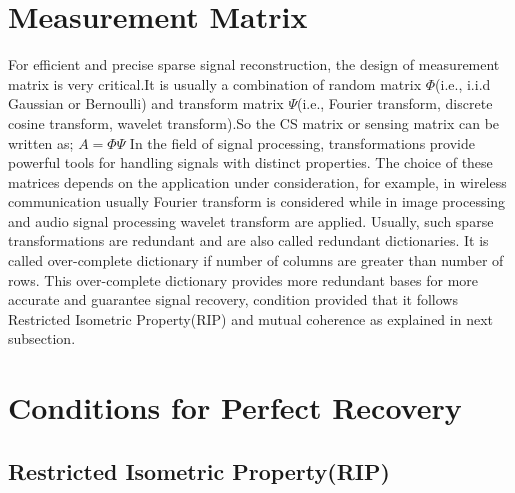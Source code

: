 


\section{Measurement Matrix}
For efficient and precise sparse signal reconstruction, the design of measurement matrix is very critical.It is usually a combination of random matrix  $\Phi$(i.e., i.i.d Gaussian or Bernoulli) and  transform matrix $\Psi$(i.e., Fourier transform, discrete cosine transform, wavelet transform).So the CS matrix or sensing matrix can be written as;
$A=\Phi \Psi$
In the field of signal processing, transformations provide powerful tools for handling signals with distinct properties.
The choice of these matrices depends on the application under consideration, for example, in wireless communication usually Fourier transform is considered while in image processing and audio signal processing wavelet transform are applied. Usually, such sparse transformations are redundant and are also called redundant dictionaries. It is called over-complete dictionary if number of columns are greater than number of rows. This over-complete dictionary provides more redundant bases for more accurate and guarantee signal recovery, condition provided that it follows Restricted Isometric Property(RIP) and mutual coherence as explained in next subsection.

\section{Conditions for Perfect Recovery}

\subsection{Restricted Isometric Property(RIP)}


